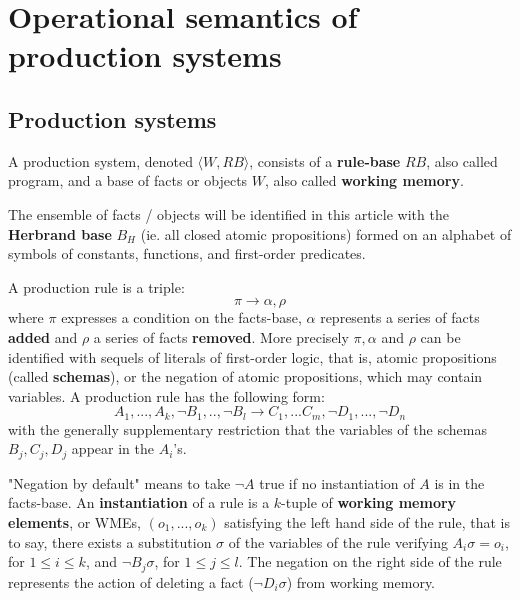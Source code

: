 \section{Operational semantics of production systems}

\subsection{Production systems}

A production system, denoted $\langle W, RB \rangle$, consists of a \textbf{rule-base} $RB$,
also called program, and a base of facts or objects $W$, also called \textbf{working memory}.

The ensemble of facts / objects will be identified in this article with the
\textbf{Herbrand base} $B_H$ (ie. all closed atomic propositions)
formed on an alphabet of symbols of constants, functions, and first-order predicates.

A production rule is a triple:
\begin{equation}
\pi \rightarrow \alpha, \rho
\nonumber
\end{equation}
where $\pi$ expresses a condition on the facts-base, $\alpha$ represents a series of facts \textbf{added} and
$\rho$ a series of facts \textbf{removed}.  More precisely $\pi, \alpha$ and $\rho$ can be identified with sequels
of literals of first-order logic, that is, atomic propositions
(called \textbf{schemas}), or the negation of atomic propositions, which may contain
variables. A production rule has the following form:
\begin{equation}
A_1, ..., A_k, \neg B_1, .., \neg B_l \rightarrow C_1, ... C_m, \neg D_1, ..., \neg D_n
\nonumber
\end{equation}
with the generally supplementary restriction that the variables of the schemas $B_j, 
C_j, D_j$ appear in the $A_i$'s.

"Negation by default" means to take $\neg A$ true if no instantiation of $A$ is
in the facts-base. An \textbf{instantiation} of a rule is a $k$-tuple of \textbf{working memory elements}, or WMEs,
$(o_1, ..., o_k)$ satisfying the left hand side of the rule,
that is to say, there exists a substitution $\sigma$ of the variables
of the rule verifying $A_i \sigma = o_i$, for $1 \le i \le k$,
and $\neg B_j \sigma$, for $1 \le j \le l$.  The negation on the right side of the rule
represents the action of deleting a fact ($\neg D_i \sigma$) from working memory.


